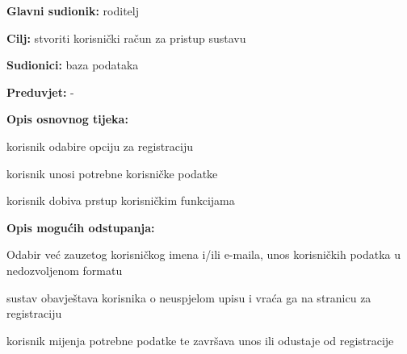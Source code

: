 					\noindent {}
					\begin{packed_item}
	
						\item \textbf{Glavni sudionik: }roditelj
						\item  \textbf{Cilj:} stvoriti korisnički račun za pristup sustavu
						\item  \textbf{Sudionici:} baza podataka
						\item  \textbf{Preduvjet:} -
						\item  \textbf{Opis osnovnog tijeka:}
						
						\item[] \begin{packed_enum}
	
							\item korisnik odabire opciju za registraciju
							\item korisnik unosi potrebne korisničke podatke
							\item korisnik dobiva prstup korisničkim funkcijama

						\end{packed_enum}
						
						\item  \textbf{Opis mogućih odstupanja:}
						
						\item[] \begin{packed_item}
	
							\item[2.a] Odabir već zauzetog korisničkog imena i/ili e-maila, unos korisničkih podatka u nedozvoljenom formatu
							\item[] \begin{packed_enum}
								
								\item sustav obavještava korisnika o neuspjelom upisu i vraća ga na stranicu za registraciju
								\item korisnik mijenja potrebne podatke te završava unos ili odustaje od registracije
							\end{packed_enum}
							
						\end{packed_item}
					\end{packed_item}

